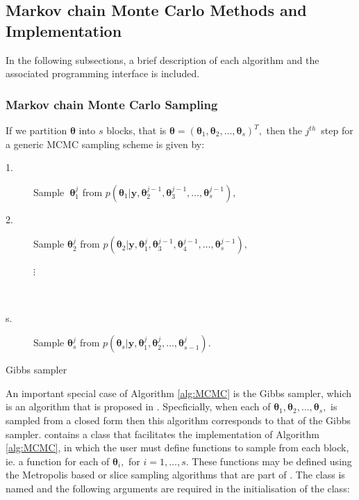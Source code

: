 \documentclass[article]{jss}
\begin{document}
\subsection{Markov chain Monte Carlo Methods and Implementation}

In the following subsections, a brief description of each algorithm
and the associated programming interface is included.


\subsubsection{Markov chain Monte Carlo Sampling}

If we partition $\bm{\theta}$ into $s$ blocks, that is
$\bm{\bm{\theta}}=\left(\bm{\theta}_{1},\bm{\theta}_{2},\ldots,\bm{\theta}_{s}\right)^{T},$
then the $j^{th}$\ step for a generic MCMC sampling scheme is given
by:

%
\begin{algorithm}[H]
\begin{description}
\item [{\textmd{1.}}] Sample\textbf{\ }$\bm{\theta}_{1}^{j}$ from $p\left(\bm{\theta}_{1}|\bm{y,}\bm{\theta}_{2}^{j-1},\bm{\theta}_{3}^{j-1},\ldots,\bm{\theta}_{s}^{j-1}\right),$ 
\item [{\textmd{2.}}] Sample $\bm{\theta}_{2}^{j}$ from $p\left(\bm{\theta}_{2}|\bm{y,}\bm{\theta}_{1}^{j},\bm{\theta}_{3}^{j-1},\bm{\theta}_{4}^{j-1},\ldots,\bm{\theta}_{s}^{j-1}\right),$

\begin{description}
\item [{$\vdots$}]~
\end{description}
\item [{\textmd{s.}}] Sample $\bm{\theta}_{s}^{j}$ from $p\left(\bm{\theta}_{s}|\bm{y,}\bm{\theta}_{1}^{j},\bm{\theta}_{2}^{j},\ldots,\bm{\theta}_{s-1}^{j}\right).$ 
\end{description}
\caption{Gibbs sampler}
\label{alg:MCMC}
\end{algorithm}

An important special case of Algorithm \ref{alg:MCMC} is the Gibbs
sampler, which is an algorithm that is proposed in \citet{GelfandSmith1990}. Specficially,
when each of $\bm{\theta}_{1},\bm{\theta}_{2},\dots,\bm{\theta}_{s},$
is sampled from a closed form then this algorithm corresponds to that
of the Gibbs sampler.  contains a class that facilitates
the implementation of Algorithm \ref{alg:MCMC}, in which the user must
define functions to sample from each block, ie. a function for each of
$\bm{\theta}_{i},$ for $i=1,\dots,s.$ These functions may be defined
using the Metropolis based or slice sampling algorithms that are part
of . The class is named  and the following
arguments are required in the initialisation of the class:
\end{document}
